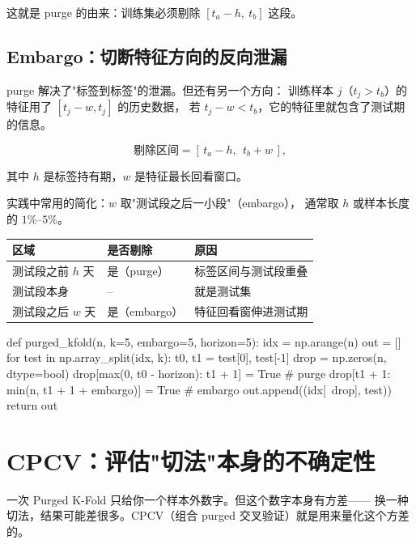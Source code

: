 这就是 purge 的由来：训练集必须剔除 $[t_a - h,\ t_b]$ 这段。

\subsection{Embargo：切断特征方向的反向泄漏}

purge 解决了"标签到标签"的泄漏。但还有另一个方向：
训练样本 $j$（$t_j > t_b$）的特征用了 $[t_j - w, t_j]$ 的历史数据，
若 $t_j - w < t_b$，它的特征里就包含了测试期的信息。

\begin{equation}
  \text{剔除区间} = [\,t_a - h,\ \ t_b + w\,],
  \label{eq:purge-full}
\end{equation}

其中 $h$ 是标签持有期，$w$ 是特征最长回看窗口。

实践中常用的简化：$w$ 取"测试段之后一小段"（embargo），
通常取 $h$ 或样本长度的 $1\%$--$5\%$。

\begin{center}
\begin{tabular}{@{}p{}p{}p{}@{}}
\toprule
\textbf{区域} & \textbf{是否剔除} & \textbf{原因} \\
\midrule
测试段之前 $h$ 天 & 是（purge） & 标签区间与测试段重叠 \\
测试段本身 & -- & 就是测试集 \\
测试段之后 $w$ 天 & 是（embargo） & 特征回看窗伸进测试期 \\
\bottomrule
\end{tabular}
\end{center}

\begin{pycode}
def purged_kfold(n, k=5, embargo=5, horizon=5):
    idx = np.arange(n)
    out = []
    for test in np.array_split(idx, k):
        t0, t1 = test[0], test[-1]
        drop = np.zeros(n, dtype=bool)
        drop[max(0, t0 - horizon): t1 + 1] = True      # purge
        drop[t1 + 1: min(n, t1 + 1 + embargo)] = True  # embargo
        out.append((idx[~drop], test))
    return out
\end{pycode}

\section{CPCV：评估"切法"本身的不确定性}

一次 Purged K-Fold 只给你一个样本外数字。但这个数字本身有方差——
换一种切法，结果可能差很多。CPCV（组合 purged 交叉验证）就是用来量化这个方差的。

